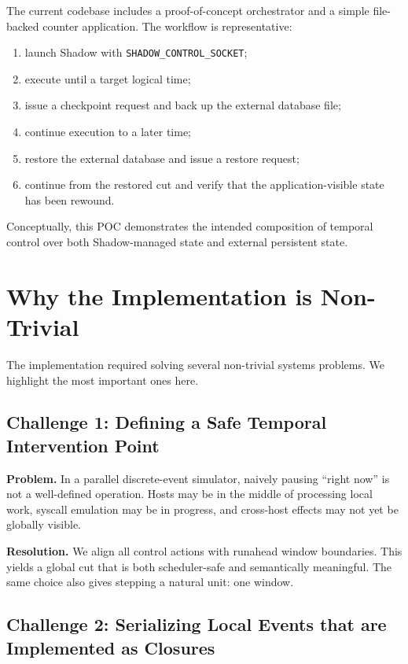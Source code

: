 \documentclass[11pt,a4paper]{article}
\begin{document}
The current codebase includes a proof-of-concept orchestrator and a simple
file-backed counter application. The workflow is representative:

\begin{enumerate}[leftmargin=1.7em]
  \item launch Shadow with \texttt{SHADOW\_CONTROL\_SOCKET};
  \item execute until a target logical time;
  \item issue a checkpoint request and back up the external database file;
  \item continue execution to a later time;
  \item restore the external database and issue a restore request;
  \item continue from the restored cut and verify that the application-visible
  state has been rewound.
\end{enumerate}

Conceptually, this POC demonstrates the intended composition of temporal
control over both Shadow-managed state and external persistent state.

\section{Why the Implementation is Non-Trivial}

The implementation required solving several non-trivial systems problems. We
highlight the most important ones here.

\subsection{Challenge 1: Defining a Safe Temporal Intervention Point}

\textbf{Problem.}
In a parallel discrete-event simulator, naively pausing ``right now'' is not a
well-defined operation. Hosts may be in the middle of processing local work,
syscall emulation may be in progress, and cross-host effects may not yet be
globally visible.

\textbf{Resolution.}
We align all control actions with runahead window boundaries. This yields a
global cut that is both scheduler-safe and semantically meaningful. The same
choice also gives stepping a natural unit: one window.

\subsection{Challenge 2: Serializing Local Events that are Implemented as Closures}
\end{document}
